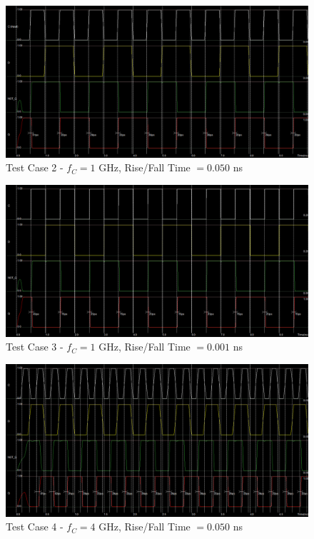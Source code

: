 \FloatBarrier

\begin{figure}[h!]
	\centering
	\includegraphics[scale=0.30]{../images/1ghz_test_case_2.PNG}
	\caption{Test Case 2 - $f_C = 1$ \si{\giga\hertz}, Rise/Fall Time $= 0.050$ \si{\nano\second}}
	\label{fig:layout_test_2}
\end{figure}

\FloatBarrier

\begin{figure}[h!]
	\centering
	\includegraphics[scale=0.30]{../images/1ghz_test_case_1.PNG}
	\caption{Test Case 3 - $f_C = 1$ \si{\giga\hertz}, Rise/Fall Time $= 0.001$ \si{\nano\second}}
	\label{fig:layout_test_3}
\end{figure}

\FloatBarrier

\begin{figure}[h!]
	\centering
	\includegraphics[scale=0.30]{../images/4ghz_test_case_2.PNG}
	\caption{Test Case 4 - $f_C = 4$ \si{\giga\hertz}, Rise/Fall Time $= 0.050$ \si{\nano\second}}
	\label{fig:layout_test_4}
\end{figure}

